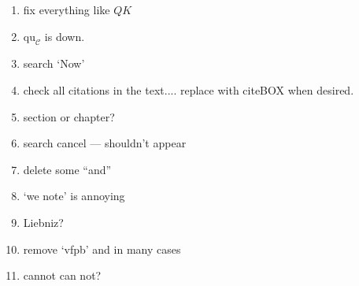 \documentclass[11pt]{amsart} \renewcommand{\baselinestretch}{1.2}
\theoremstyle{plain}
\numberwithin{equation}{section} %
\theoremstyle{plain}
\numberwithin{equation}{chapter} %
\renewcommand{\to}{\longrightarrow}
\newcommand{\calc}{\mathcal{C}}
\newcommand{\quadratic}{\mathrm{qu}}
\begin{document}
\begin{todolist}
\begin{enumerate}
\item fix everything like $QK$
\item $\quadratic_\calc$ is down.
\item search `Now'
\item check all citations in the text.... replace with citeBOX when desired.
\item section or chapter?
\item search cancel --- shouldn't appear
\item delete some ``and''
\item `we note' is annoying
\item Liebniz?
\item remove `vfpb' and \hfil in many cases
\item cannot can not?
\end{enumerate}
\end{todolist}
\begin{bibliog}
\printbibliography
\end{bibliog}
\end{document}
